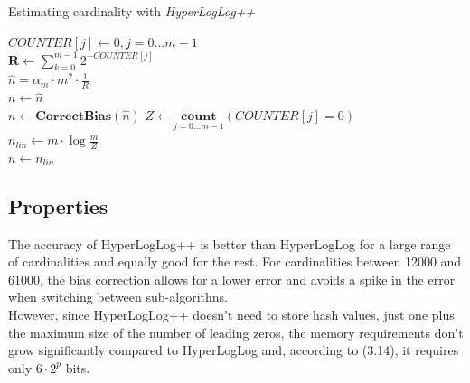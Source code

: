 \documentclass[a4paper,13pt]{article}
\theoremstyle{mytheor}
\begin{document}
\begin{algorithm}[H]
    \vspace{0.25cm}
    \DontPrintSemicolon
    \LinesNumberedHidden
    \caption[]{Estimating cardinality with \textit{HyperLogLog++}}
    $COUNTER[j] \gets 0, j = 0 ... m-1$\\
    $\textbf{R} \gets \sum\limits_{k=0}^{m-1}2^{-COUNTER[j]}$\\
    $\hat{n} = \alpha_m \cdot m^2 \cdot \frac{1}{R}$\\
    $n \gets \hat{n}$\\
    {
        $n \gets \textbf{CorrectBias}(\hat{n})$
    }
    $Z \gets \underset{j=0...m-1}{\textbf{count}}(COUNTER[j] = 0)$\\
    {
        $n_{lin} \gets m \cdot \log\frac{m}{Z}$\\
        {
            $n \gets n_{lin}$
        }
    }
    \vspace{0.25cm}
\end{algorithm}
\subsection*{Properties}
The accuracy of HyperLogLog++ is better than HyperLogLog for a large
range of cardinalities and equally good for the rest. For cardinalities
between 12000 and 61000, the bias correction allows for a lower error
and avoids a spike in the error when switching between sub-algorithns.\\
\indent However, since HyperLogLog++ doesn't need to store hash values, just
one plus the maximum size of the number of leading zeros, the memory
requirements don't grow significantly compared to HyperLogLog and,
according to (3.14), it requires only $6\cdot2^p$ bits.\\
\end{document}
